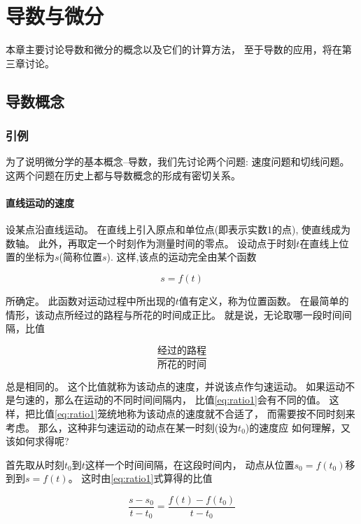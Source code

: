 \chapter{导数与微分}

本章主要讨论导数和微分的概念以及它们的计算方法，
至于导数的应用，将在第三章讨论。

\section{导数概念}

    \subsection{引例}

    为了说明微分学的基本概念--导数，我们先讨论两个问题:
    速度问题和切线问题。
    这两个问题在历史上都与导数概念的形成有密切关系。
        
    \subsubsection{直线运动的速度}

    设某点沿直线运动。
    在直线上引入原点和单位点(即表示实数1的点), 使直线成为数轴。
    此外，再取定一个时刻作为测量时间的零点。
    设动点于时刻$t$在直线上位置的坐标为$s$(简称位置$s$).
    这样,该点的运动完全由某个函数

    \[s=f(t)\]

    所确定。
    此函数对运动过程中所出现的$t$值有定义，称为位置函数。
    在最简单的情形，该动点所经过的路程与所花的时间成正比。
    就是说，无论取哪一段时间间隔，比值

    \begin{equation} 
        \frac{\text{经过的路程}}{\text{所花的时间}}
        \label{eq:ratio1}
    \end{equation} 

    总是相同的。
    这个比值就称为该动点的速度，并说该点作匀速运动。
    如果运动不是匀速的，那么在运动的不同时间间隔内，
    比值\eqref{eq:ratio1}会有不同的值。
    这样，把比值\eqref{eq:ratio1}笼统地称为该动点的速度就不合适了，
    而需要按不同时刻来考虑。
    那么，这种非匀速运动的动点在某一时刻(设为$t_0$)的速度应
    如何理解，又该如何求得呢?

    首先取从时刻$t_0$到$t$这样一个时间间隔，在这段时间内，
    动点从位置$s_0=f(t_0)$移到到$s=f(t)$。
    这时由\eqref{eq:ratio1}式算得的比值

    \begin{equation}
        \frac{s-s_0}{t-t_0}=\frac{f(t)-f(t_0)}{t-t_0}
        \label{eq:ratio2}
    \end{equation}

